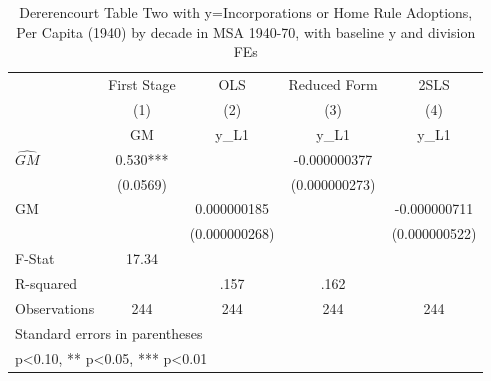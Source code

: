 \begin{table}[htbp]\centering
\def\sym#1{\ifmmode^{#1}\else\(^{#1}\)\fi}
\caption{Dererencourt Table Two with y=Incorporations or Home Rule Adoptions, Per Capita (1940) by decade in MSA 1940-70, with baseline y and division FEs}
\begin{tabular}{l*{4}{c}}
\toprule
                    & First Stage   &         OLS   &Reduced Form   &        2SLS   \\
                    &\multicolumn{1}{c}{(1)}&\multicolumn{1}{c}{(2)}&\multicolumn{1}{c}{(3)}&\multicolumn{1}{c}{(4)}\\
                    &\multicolumn{1}{c}{GM}&\multicolumn{1}{c}{y\_L1}&\multicolumn{1}{c}{y\_L1}&\multicolumn{1}{c}{y\_L1}\\
\midrule
$\hat{GM}$          &       0.530***&               &-0.000000377   &               \\
                    &    (0.0569)   &               &(0.000000273)   &               \\
\addlinespace
GM                  &               & 0.000000185   &               &-0.000000711   \\
                    &               &(0.000000268)   &               &(0.000000522)   \\
\midrule
F-Stat              &       17.34   &               &               &               \\
R-squared           &               &        .157   &        .162   &               \\
Observations        &         244   &         244   &         244   &         244   \\
\bottomrule
\multicolumn{5}{l}{\footnotesize Standard errors in parentheses}\\
\multicolumn{5}{l}{\footnotesize * p<0.10, ** p<0.05, *** p<0.01}\\
\end{tabular}
\end{table}
